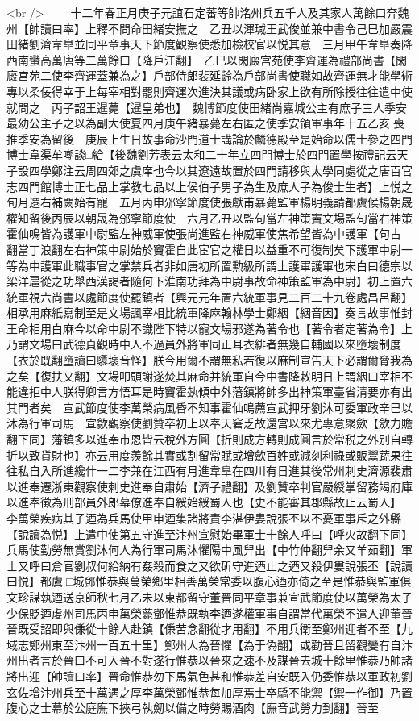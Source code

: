 <br />
　　十二年春正月庚子元誼石定蕃等帥洺州兵五千人及其家人萬餘口奔魏州【帥讀曰率】上釋不問命田緒安撫之　乙丑以渾瑊王武俊並兼中書令己巳加嚴震田緒劉濟韋臯並同平章事天下節度觀察使悉加檢校官以悦其意　三月甲午韋臯奏降西南蠻高萬唐等二萬餘口【降戶江翻】　乙巳以閑廄宫苑使李齊運為禮部尚書【閑廄宫苑二使李齊運蓋兼為之】戶部侍郎裴延齡為戶部尚書使職如故齊運無才能學術專以柔佞得幸于上每宰相對罷則齊運次進決其議或病卧家上欲有所除授往往遣中使就問之　丙子韶王暹薨【暹皇弟也】　魏博節度使田緒尚嘉城公主有庶子三人季安最幼公主子之以為副大使夏四月庚午緒暴薨左右匿之使季安領軍事年十五乙亥喪推季安為留後　庚辰上生日故事命沙門道士講論於麟德殿至是始命以儒士參之四門博士韋渠牟嘲談□給【後魏劉芳表云太和二十年立四門博士於四門置學按禮記云天子設四學鄭注云周四郊之虞庠也今以其遼遠故置於四門請移與太學同處從之唐百官志四門館博士正七品上掌教七品以上侯伯子男子為生及庶人子為俊士生者】上悦之旬月遷右補闕始有寵　五月丙申邠寧節度使張獻甫暴薨監軍楊明義請都虞候楊朝晟權知留後丙辰以朝晟為邠寧節度使　六月乙丑以監句當左神策竇文場監句當右神策霍仙鳴皆為護軍中尉監左神威軍使張尚進監右神威軍使焦希望皆為中護軍【句古翻當丁浪翻左右神策中尉始於竇霍自此宦官之權日以益重不可復制矣下護軍中尉一等為中護軍此職事官之掌禁兵者非如唐初所置勲級所謂上護軍護軍也宋白曰德宗以梁洋扈從之功舉西漢謁者隨何下淮南功拜為中尉事故命神策監軍為中尉】初上置六統軍視六尚書以處節度使罷鎮者【興元元年置六統軍事見二百二十九卷處昌呂翻】相承用麻紙寫制至是文場諷宰相比統軍降麻翰林學士鄭絪【絪音因】奏言故事惟封王命相用白麻今以命中尉不識陛下特以寵文場邪遂為著令也【著令者定著為令】上乃謂文場曰武德貞觀時中人不過員外將軍同正耳衣緋者無幾自輔國以來墮壞制度【衣於既翻墮讀曰隳壞音怪】朕今用爾不謂無私若復以麻制宣告天下必謂爾脅我為之矣【復扶又翻】文場叩頭謝遂焚其麻命并統軍自今中書降敕明日上謂絪曰宰相不能違拒中人朕得卿言方悟耳是時竇霍埶傾中外藩鎮將帥多出神策軍臺省清要亦有出其門者矣　宣武節度使李萬榮病風昏不知事霍仙鳴薦宣武押牙劉沐可委軍政辛巳以沐為行軍司馬　宣歙觀察使劉贊卒初上以奉天窘乏故還宫以來尤專意聚歛【歛力贍翻下同】藩鎮多以進奉市恩皆云稅外方圓【折則成方轉則成圓言於常税之外别自轉折以致貨財也】亦云用度羨餘其實或割留常賦或增歛百姓或減刻利祿或販鬻蔬果往往私自入所進纔什一二李兼在江西有月進韋臯在四川有日進其後常州刺史濟源裴肅以進奉遷浙東觀察使刺史進奉自肅始【濟子禮翻】及劉贊卒判官嚴綬掌留務竭府庫以進奉徵為刑部員外郎幕僚進奉自綬始綬蜀人也【史不能審其郡縣故止云蜀人】　李萬榮疾病其子迺為兵馬使甲申迺集諸將責李湛伊婁說張丕以不憂軍事斥之外縣【說讀為悦】上遣中使第五守進至汴州宣慰始畢軍士十餘人呼曰【呼火故翻下同】兵馬使勤勞無賞劉沐何人為行軍司馬沐懼陽中風舁出【中竹仲翻舁余又羊茹翻】軍士又呼曰倉官劉叔何給納有姦殺而食之又欲斫守進迺止之迺又殺伊婁說張丕【說讀曰悦】都虞□城鄧惟恭與萬榮鄉里相善萬榮常委以腹心迺亦倚之至是惟恭與監軍俱文珍謀執迺送京師秋七月乙未以東都留守董晉同平章事兼宣武節度使以萬榮為太子少保貶迺䖍州司馬丙申萬榮薨鄧惟恭既執李迺遂權軍事自謂當代萬榮不遣人迎董晉晉既受詔即與傔從十餘人赴鎮【傔苦念翻從才用翻】不用兵衛至鄭州迎者不至【九域志鄭州東至汴州一百五十里】鄭州人為晉懼【為于偽翻】或勸晉且留觀變有自汴州出者言於晉曰不可入晉不對遂行惟恭以晉來之速不及謀晉去城十餘里惟恭乃帥諸將出迎【帥讀曰率】晉命惟恭勿下馬氣色甚和惟恭差自安既入仍委惟恭以軍政初劉玄佐增汴州兵至十萬遇之厚李萬榮鄧惟恭每加厚焉士卒驕不能禦【禦一作御】乃置腹心之士幕於公庭廡下挾弓執劒以備之時勞賜酒肉【廡音武勞力到翻】晉至